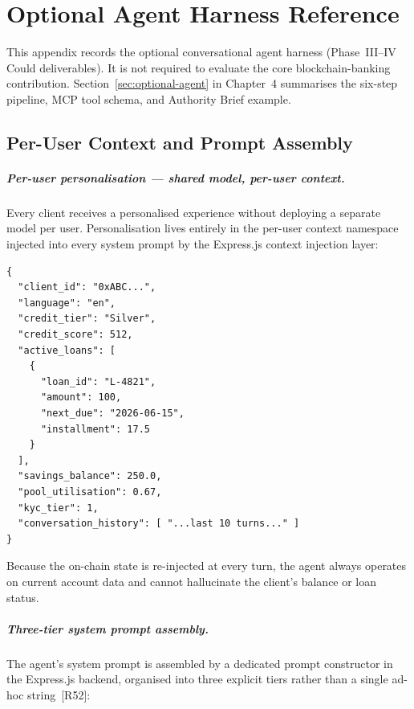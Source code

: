 \documentclass[12pt,a4paper]{report}
\begin{document}
\chapter{Optional Agent Harness Reference}
\label{app:agent-harness}

This appendix records the optional conversational agent harness (Phase~III--IV Could deliverables). It is not required to evaluate the core blockchain-banking contribution. Section~\ref{sec:optional-agent} in Chapter~4 summarises the six-step pipeline, MCP tool schema, and Authority Brief example.

\section{Per-User Context and Prompt Assembly}

\paragraph{Per-user personalisation --- shared model, per-user context.}
Every client receives a personalised experience without deploying a separate model per user. Personalisation lives entirely in the per-user context namespace injected into every system prompt by the Express.js context injection layer:

\begin{verbatim}
{
  "client_id": "0xABC...",
  "language": "en",
  "credit_tier": "Silver",
  "credit_score": 512,
  "active_loans": [
    {
      "loan_id": "L-4821",
      "amount": 100,
      "next_due": "2026-06-15",
      "installment": 17.5
    }
  ],
  "savings_balance": 250.0,
  "pool_utilisation": 0.67,
  "kyc_tier": 1,
  "conversation_history": [ "...last 10 turns..." ]
}
\end{verbatim}

\noindent Because the on-chain state is re-injected at every turn, the agent always operates on current account data and cannot hallucinate the client's balance or loan status.

\paragraph{Three-tier system prompt assembly.}
The agent's system prompt is assembled by a dedicated prompt constructor in the Express.js backend, organised into three explicit tiers rather than a single ad-hoc string~[R52]:
\end{document}
